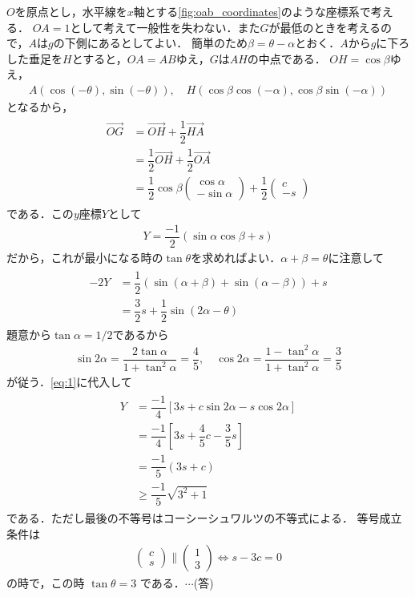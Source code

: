 \documentclass[../../main.tex]{subfiles}
\begin{document}
$O$を原点とし，水平線を$x$軸とする\cref{fig:oab_coordinates}のような座標系で考える．
$OA=1$として考えて一般性を失わない．また$G$が最低のときを考えるので，$A$は$g$の下側にあるとしてよい．
簡単のため$\beta=\theta-\alpha$とおく．$A$から$g$に下ろした垂足を$H$とすると，$OA=AB$ゆえ，$G$は$AH$の中点である．
$OH=\cos\beta$ゆえ，
\begin{align}
  A(\cos(-\theta),\sin(-\theta)), \quad
  H(\cos\beta\cos(-\alpha),\cos\beta\sin(-\alpha))
\end{align}
となるから，
\begin{align}
  \begin{split}
    \overrightarrow{OG}&=\overrightarrow{OH}+\dfrac{1}{2}\overrightarrow{HA} \\
    &=\dfrac{1}{2}\overrightarrow{OH}+\dfrac{1}{2}\overrightarrow{OA} \\
    &=\dfrac{1}{2}\cos\beta
    \begin{pmatrix}\cos\alpha\\-\sin\alpha
    \end{pmatrix}+\dfrac{1}{2}
    \begin{pmatrix}c\\-s
    \end{pmatrix}
  \end{split}
\end{align}
である．この$y$座標$Y$として
\begin{align}
  Y=\dfrac{-1}{2}(\sin\alpha\cos\beta+s)
\end{align}
だから，これが最小になる時の$\tan\theta$を求めればよい．$\alpha+\beta=\theta$に注意して
\begin{align}
  \begin{split}
    -2Y&=\dfrac{1}{2}(\sin(\alpha+\beta)+\sin(\alpha-\beta))+s \\
    &=\dfrac{3}{2}s+\dfrac{1}{2}\sin(2\alpha-\theta) \label{eq:1}
  \end{split}
\end{align}
題意から$\tan\alpha=1/2$であるから
\begin{align}
  \sin2\alpha=\dfrac{2\tan\alpha}{1+\tan^2\alpha}=\dfrac{4}{5}, \quad
  \cos2\alpha=\dfrac{1-\tan^2\alpha}{1+\tan^2\alpha}=\dfrac{3}{5}
\end{align}
が従う．\cref{eq:1}に代入して
\begin{align}
  \begin{split}
    Y&=\dfrac{-1}{4}[3s+c\sin2\alpha -s\cos2\alpha ] \\
    &=\dfrac{-1}{4}[3s+\dfrac{4}{5} c-\dfrac{3}{5} s] \\
    &=\dfrac{-1}{5}(3s+c) \\
    &\ge \dfrac{-1}{5}\sqrt{3^2+1}
  \end{split}
\end{align}
である．ただし最後の不等号はコーシーシュワルツの不等式による．
等号成立条件は
\begin{align}
  \begin{pmatrix}c\\s
  \end{pmatrix}\parallel
  \begin{pmatrix}1\\3
  \end{pmatrix}
  \iff s-3c=0
\end{align}
の時で，この時 $\tan\theta=3$ である．$\cdots$(答)

\newpage
\end{document}
